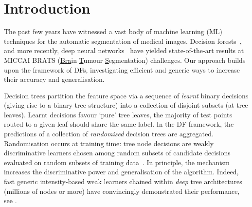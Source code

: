 
\section{Introduction}
\label{sec:intro}

The past few years have witnessed a vast body of machine learning (ML) techniques for 
the automatic segmentation of medical images. Decision forests~\cite{zikic2012decision,tustison2013ants},
and more recently, deep neural networks~\cite{pereira2015deep} have yielded state-of-the-art results at 
MICCAI BRATS (\uline{Bra}in \uline{T}umour \uline{S}egmentation) challenges. 
Our approach builds upon the framework of DFs, investigating efficient and generic ways to increase their accuracy and generalisation. %

 

Decision trees partition the feature space via a sequence of \textit{learnt} 
binary decisions (giving rise to a binary tree structure) into a collection of disjoint subsets (at tree leaves). 
Learnt decisions favour `pure' tree leaves, \eg the majority of test points routed to a given leaf should share the 
same label. In the DF framework, the predictions of a collection of \textit{randomised} decision trees are aggregated. 
Randomisation occurs at training time: tree node decisions are weakly discriminative learners chosen among random 
subsets of candidate decisions~\cite{amit1997shape,ho1998random} evaluated on random subsets of training data~\cite{breiman2001random}. In principle, the mechanism increases the discriminative power and generalisation of the algorithm. Indeed, fast generic intensity-based weak learners chained within \textit{deep} tree architectures (millions of nodes or more) have 
convincingly demonstrated their performance, see \eg \cite{criminisi2013decision}. 

